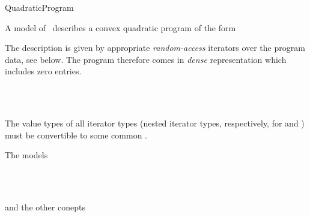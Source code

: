 \begin{ccRefConcept}{QuadraticProgram}

\ccDefinition
A model of \ccRefName\ describes a convex quadratic program of the form


The description is given by appropriate \emph{random-access} 
iterators over the program data, see below. The program therefore 
comes in \emph{dense} representation which includes zero entries.

\ccHasModels
{}\\
\\

\ccTypes









\ccOperations










\ccRequirements

The value types of all iterator types (nested iterator types,
respectively, for  and ) must be
convertible to some common  .

\ccSeeAlso
The models

\\
\\

and the other conepts

\\
\\
\end{ccRefConcept}
